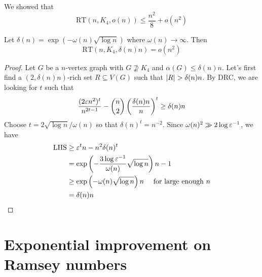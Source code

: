 \documentclass{article}
\begin{document}
We showed that
$$\mathrm{RT}(n, K_4, o(n)) \le \frac{n^2}8 + o(n^2)$$

\begin{thm}[Sudakov]
  Let $\delta(n) = \exp(-\omega(n)\sqrt{\log n})$ where $\omega(n) \to \infty$. Then
  $$\mathrm{RT}(n, K_4, \delta(n) n) = o(n^2)$$
\end{thm}
\begin{proof}
  Let $G$ be a $n$-vertex graph with $G \not\supseteq K_4$ and $\alpha(G) \le \delta(n)n$. Let's first find a $(2, \delta(n)n)$-rich set $R \subseteq V(G)$ such that $\left\lvert R\right\rvert > \delta(n)n$. By DRC, we are looking for $t$ such that
  $$\frac{(2\varepsilon n^2)^t}{n^{2t - 1}} - \binom n2 \left(\frac{\delta(n)n}n\right)^t \ge \delta(n)n$$
  Choose $t = 2\sqrt{\log n}/\omega(n)$ so that $\delta(n)^t = n^{-2}$. Since $\omega(n)^2 \gg 2\log\varepsilon^{-1}$, we have
  \begin{align*}
    \operatorname{LHS}
    & \ge \varepsilon^t n - n^2 \delta(n)^t \\
    & = \exp\left(-\frac{3\log \varepsilon^{-1}}{\omega(n)}\sqrt{\log n}\right)n - 1 \\
    & \ge \exp\left(-\omega(n)\sqrt{\log n}\right)n \quad \text{ for large enough }n \\
    & = \delta(n)n
  \end{align*}
\end{proof}


\section{Exponential improvement on Ramsey numbers}

\newlec

\printindex
\end{document}
